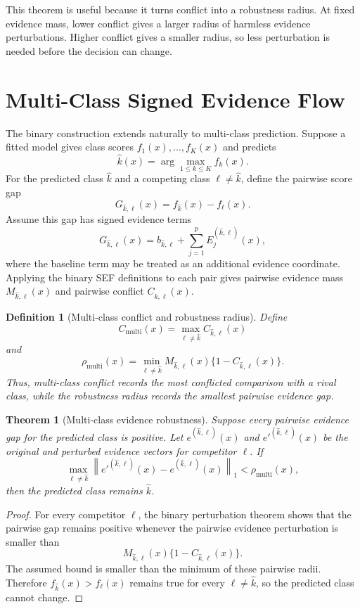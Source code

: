 \documentclass[11pt]{article}
\newtheorem{definition}{Definition}
\newtheorem{theorem}{Theorem}
\begin{document}
This theorem is useful because it turns conflict into a robustness radius. At fixed evidence mass, lower conflict gives a larger radius of harmless evidence perturbations. Higher conflict gives a smaller radius, so less perturbation is needed before the decision can change.

\section{Multi-Class Signed Evidence Flow}

The binary construction extends naturally to multi-class prediction. Suppose a fitted model gives class scores $f_1(x),\ldots,f_K(x)$ and predicts
\[
\widehat{k}(x)=\arg\max_{1\leq k\leq K} f_k(x).
\]
For the predicted class $\widehat{k}$ and a competing class $\ell\neq\widehat{k}$, define the pairwise score gap
\[
G_{\widehat{k},\ell}(x)=f_{\widehat{k}}(x)-f_\ell(x).
\]
Assume this gap has signed evidence terms
\[
G_{\widehat{k},\ell}(x)
=
b_{\widehat{k},\ell}
+
\sum_{j=1}^p E_j^{(\widehat{k},\ell)}(x),
\]
where the baseline term may be treated as an additional evidence coordinate. Applying the binary SEF definitions to each pair gives pairwise evidence mass $M_{\widehat{k},\ell}(x)$ and pairwise conflict $C_{\widehat{k},\ell}(x)$.

\begin{definition}[Multi-class conflict and robustness radius]
Define
\[
C_{\mathrm{multi}}(x)
=
\max_{\ell\neq\widehat{k}}
C_{\widehat{k},\ell}(x)
\]
and
\[
\rho_{\mathrm{multi}}(x)
=
\min_{\ell\neq\widehat{k}}
M_{\widehat{k},\ell}(x)
\{1-C_{\widehat{k},\ell}(x)\}.
\]
Thus, multi-class conflict records the most conflicted comparison with a rival class, while the robustness radius records the smallest pairwise evidence gap.
\end{definition}

\begin{theorem}[Multi-class evidence robustness]
Suppose every pairwise evidence gap for the predicted class is positive. Let $e^{(\widehat{k},\ell)}(x)$ and $e'^{(\widehat{k},\ell)}(x)$ be the original and perturbed evidence vectors for competitor $\ell$. If
\[
\max_{\ell\neq\widehat{k}}
\left\|
e'^{(\widehat{k},\ell)}(x)
-
e^{(\widehat{k},\ell)}(x)
\right\|_1
<
\rho_{\mathrm{multi}}(x),
\]
then the predicted class remains $\widehat{k}$.
\end{theorem}

\begin{proof}
For every competitor $\ell$, the binary perturbation theorem shows that the pairwise gap remains positive whenever the pairwise evidence perturbation is smaller than
\[
M_{\widehat{k},\ell}(x)
\{1-C_{\widehat{k},\ell}(x)\}.
\]
The assumed bound is smaller than the minimum of these pairwise radii. Therefore $f_{\widehat{k}}(x)>f_\ell(x)$ remains true for every $\ell\neq\widehat{k}$, so the predicted class cannot change.
\end{proof}
\end{document}
